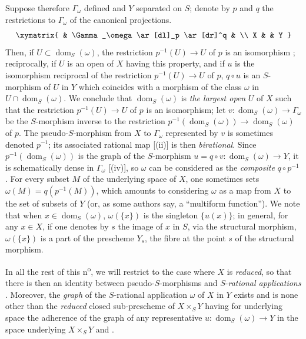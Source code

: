 \begin{env}[20.4.2]
\label{IV.20.4.2}
Suppose therefore $\Gamma_\omega$ defined and $Y$ separated on $S$;
denote by $p$ and $q$ the restrictions to $\Gamma_\omega$ of the canonical projections.
\[
  \xymatrix{
  & \Gamma_\omega \ar[dl]_p \ar[dr]^q & \\
  X & & Y
  }
\]
Then, if $U\subset\operatorname{dom}_S(\omega)$, the restriction $p^{-1}(U)\to U$ of $p$ is an isomorphism ;
reciprocally, if $U$ is an open of $X$ having this property, and if $u$ is the isomorphism reciprocal of the restriction $p^{-1}(U)\to U$ of $p$, $q\circ u$ is an $S$-morphism of $U$ in $Y$ which coincides with a morphism of the class $\omega$ in $U\cap\operatorname{dom}_S(\omega)$.
We conclude that $\operatorname{dom}_S(\omega)$ is \emph{the largest open} $U$ of $X$ such that the restriction $p^{-1}(U)\to U$ of $p$ is an isomorphism;
let $v:\operatorname{dom}_S(\omega)\to\Gamma_\omega$ be the $S$-morphism inverse to the restriction $p^{-1}(\operatorname{dom}_S(\omega))\to\operatorname{dom}_S(\omega)$ of $p$.
The pseudo-$S$-morphism from $X$ to $\Gamma_\omega$ represented by $v$ is sometimes denoted $p^{-1}$; its associated rational map [(ii)] is then \emph{birational}.
Since $p^{-1}(\operatorname{dom}_S(\omega))$ is the graph of the $S$-morphism $u=q\circ v:\operatorname{dom}_S(\omega)\to Y$, it is schematically dense in $\Gamma_\omega$ [(iv)], so $\omega$ can be considered as the \emph{composite} $q\circ p^{-1}$ .
For every subset $M$ of the underlying space of $X$, one sometimes sets $\omega(M)=q(p^{-1}(M))$, which amounts to considering $\omega$ as a map from $X$ to the set of subsets of $Y$ (or, as some authors say, a ``multiform function'').
We note that when $x\in\operatorname{dom}_S(\omega)$, $\omega(\{x\})$ is the singleton $\{u(x)\}$;
in general, for any $x\in X$, if one denotes by $s$ the image of $x$ in $S$, via the structural morphism, $\omega(\{x\})$ is a part of the prescheme $Y_s$, the fibre at the point $s$ of the structural morphism.
\end{env}

\begin{env}[20.4.3]
\label{IV.20.4.3}
In all the rest of this n\textsuperscript{o}, we will restrict to the case where $X$ is \emph{reduced}, so that there is then an identity between pseudo-$S$-morphisms and $S$-\emph{rational applications} .
Moreover, the \emph{graph} of the $S$-rational application $\omega$ of $X$ in $Y$ exists and is none other than the \emph{reduced} closed sub-prescheme of $X\times_S Y$ having for underlying space the adherence of the graph of any representative $u:\operatorname{dom}_S(\omega)\to Y$ in the space underlying $X\times_S Y$  and .
\end{env}

